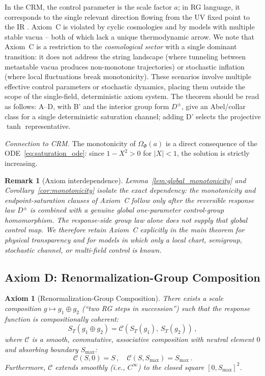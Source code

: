 \documentclass[aps,prd,twocolumn,superscriptaddress,nofootinbib]{revtex4-2}
\newtheorem{remark}{Remark}
\newtheorem{axiom}{Axiom}
\begin{document}
In the CRM, the control parameter is the scale factor $a$; in RG language, it corresponds to the single relevant direction flowing from the UV fixed point to the IR \cite{Percacci2017}. Axiom~C is violated by cyclic cosmologies and by models with multiple stable vacua -- both of which lack a unique thermodynamic arrow. We note that Axiom~C is a restriction to the \textit{cosmological sector} with a single dominant transition: it does not address the string landscape (where tunneling between metastable vacua produces non-monotone trajectories) or stochastic inflation (where local fluctuations break monotonicity). These scenarios involve multiple effective control parameters or stochastic dynamics, placing them outside the scope of the single-field, deterministic axiom system. The theorem should be read as follows: A--D, with B' and the interior group form $D^\pm$, give an Abel/collar class for a single deterministic saturation channel; adding D' selects the projective $\tanh$ representative.

\textit{Connection to CRM.} The monotonicity of $\Omega_\Phi(a)$ is a direct consequence of the ODE~\eqref{eq:saturation_ode}: since $1 - X^2 > 0$ for $|X| < 1$, the solution is strictly increasing.

\begin{remark}[Axiom interdependence]
Lemma~\ref{lem:global_monotonicity} and Corollary~\ref{cor:monotonicity} isolate the exact dependency: the monotonicity and endpoint-saturation clauses of Axiom~C follow only after the reversible response law $D^\pm$ is combined with a genuine global one-parameter control-group homomorphism. The response-side group law alone does not supply that global control map. We therefore retain Axiom~C explicitly in the main theorem for physical transparency and for models in which only a local chart, semigroup, stochastic channel, or multi-field control is known.
\end{remark}

\subsection{Axiom D: Renormalization-Group Composition}

\begin{axiom}[Renormalization-Group Composition]
\label{ax:composition}
There exists a scale composition $g \mapsto g_1 \oplus g_2$ (``two RG steps in succession'') such that the response function is compositionally coherent:
\begin{equation}
S_T(g_1 \oplus g_2) = \mathcal{C}\!\left(S_T(g_1),\, S_T(g_2)\right)\,,
\label{eq:composition}
\end{equation}
where $\mathcal{C}$ is a smooth, commutative, associative composition with neutral element $0$ and absorbing boundary $S_{\max}$:
\begin{equation}
\mathcal{C}(S, 0) = S\,, \quad \mathcal{C}(S, S_{\max}) = S_{\max}\,.
\label{eq:composition_boundary}
\end{equation}
Furthermore, $\mathcal{C}$ extends smoothly (i.e., $C^\infty$) to the closed square $[0, S_{\max}]^2$.
\end{axiom}
\end{document}
